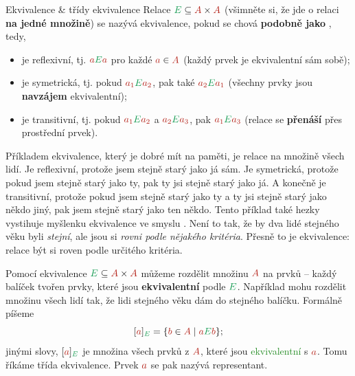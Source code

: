 \documentclass[final]{beamer}
\newlength{\colwidth}
\newcommand{\clr}{\textcolor{BrickRed}}
\newcommand{\clg}{\textcolor{ForestGreen}}
\begin{document}
\begin{frame}[t]
\begin{columns}[t]
\begin{column}{\colwidth}
\begin{exampleblock}{Ekvivalence \& třídy ekvivalence}
 Relace $\clg{E} \subseteq \clr{A} \times \clr{A}$ (všimněte si, že jde o relaci
 \textbf{na jedné množině}) se nazývá \alert{ekvivalence}, pokud se chová
 \textbf{podobně jako }, tedy,
 \begin{itemize}[left=2em]
  \item[(R)] je \alert{reflexivní}, tj. $\clr{a}\clg{E}\clr{a}$ pro každé
   $\clr{a} \in \clr{A}$ (každý prvek je ekvivalentní sám sobě);
  \item[(S)] je \alert{symetrická}, tj. pokud $\clr{a_1}\clg{E}\clr{a_2}$, pak
   také $\clr{a_2}\clg{E}\clr{a_1}$ (všechny prvky jsou \textbf{navzájem}
   ekvivalentní);
  \item[(T)] je \alert{transitivní}, tj. pokud $\clr{a_1}\clg{E}\clr{a_2}$ a
   $\clr{a_2} \clg{E} \clr{a_3}$, pak $\clr{a_1} \clg{E} \clr{a_3}$ (relace se
   \textbf{přenáší} přes prostřední prvek).
 \end{itemize}
 Příkladem ekvivalence, který je dobré mít na paměti, je relace  na množině všech lidí. Je \alert{reflexivní}, protože jsem
 stejně starý jako já sám. Je \alert{symetrická}, protože pokud jsem stejně
 starý jako ty, pak ty jsi stejně starý jako já. A konečně je
 \alert{transitivní}, protože pokud jsem stejně starý jako ty a ty jsi stejně
 starý jako někdo jiný, pak jsem stejně starý jako ten někdo. Tento příklad také
 hezky vystihuje myšlenku ekvivalence ve smyslu . Není to
 tak, že by dva lidé stejného věku byli \emph{stejní}, ale jsou si \emph{rovni
 podle nějakého kritéria}. Přesně to je ekvivalence: relace být si roven podle
 určitého kritéria.

 Pomocí ekvivalence $\clg{E} \subseteq \clr{A} \times \clr{A}$ můžeme rozdělit
 množinu $\clr{A}$ na  prvků -- každý balíček tvořen prvky, které
 jsou \textbf{ekvivalentní} podle $\clg{E}$. Například mohu rozdělit množinu
 všech lidí tak, že lidi stejného věku dám do stejného balíčku. Formálně píšeme
 \[
  [\clr{a}]_{\clg{E}} = \{\clr{b} \in \clr{A} \mid \clr{a}\clg{E}\clr{b}\};
 \]
 jinými slovy, $[\clr{a}]_{\clg{E}}$ je množina všech prvků z $\clr{A}$, které
 jsou \clg{ekvivalentní} s $\clr{a}$. Tomu říkáme \alert{třída ekvivalence}.
 Prvek $\clr{a}$ se pak nazývá \alert{representant}.


\end{exampleblock}
\end{column}
\end{columns}
\end{frame}
\end{document}
